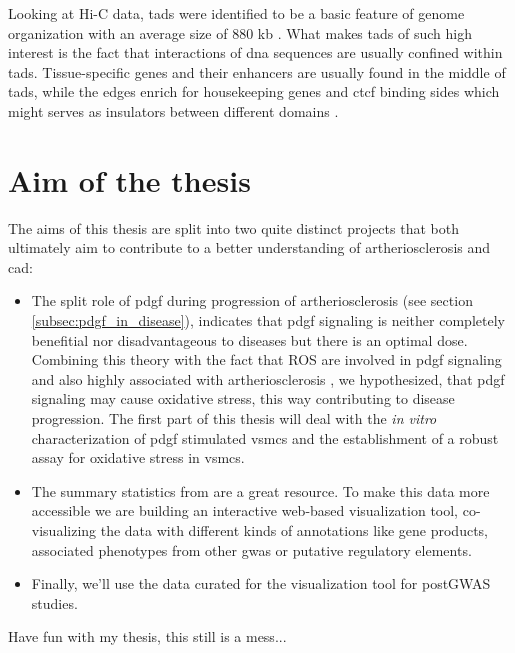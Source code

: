     Looking at Hi-C data, \acp{tad} were identified to be a basic feature of genome organization with an average size of 880 kb \cite{dixonTopologicalDomainsMammalian2012, wang3DGenomeBrowser2018}. What makes \acp{tad} of such high interest is the fact that interactions of \ac{dna} sequences are usually confined within \acp{tad}. Tissue-specific genes and their enhancers are usually found in the middle of \acp{tad}, while the edges enrich for housekeeping genes and \ac{ctcf} binding sides which might serves as insulators between different domains \cite{pomboThreedimensionalGenomeArchitecture2015}.


\section{Aim of the thesis}
\label{sec:Aim}
The aims of this thesis are split into two quite distinct projects that both ultimately aim to contribute to a better understanding of artheriosclerosis and \ac{cad}:

\begin{itemize}
    \item The split role of \ac{pdgf} during progression of artheriosclerosis (see section \ref{subsec:pdgf_in_disease}), indicates that \ac{pdgf} signaling is neither completely benefitial nor disadvantageous to diseases but there is an optimal dose. Combining this theory with the fact that \ac{ROS} are involved in \ac{pdgf} signaling and also highly associated with artheriosclerosis \cite{burtenshawReactiveOxygenSpecies2019}, we hypothesized, that \ac{pdgf} signaling may cause oxidative stress, this way contributing to disease progression. The first part of this thesis will deal with the \textit{in vitro} characterization of \ac{pdgf} stimulated \acp{vsmc} and the establishment of a robust assay for oxidative stress in \acp{vsmc}.
    \item The summary statistics from \textcite{aragamDiscoverySystematicCharacterization2021} are a great resource. To make this data more accessible we are building an interactive web-based visualization tool, co-visualizing the data with different kinds of annotations like gene products, associated phenotypes from other \ac{gwas} or putative regulatory elements.
    \item Finally, we'll use the data curated for the visualization tool for postGWAS studies.
\end{itemize}

Have fun with my thesis, this still is a mess...
